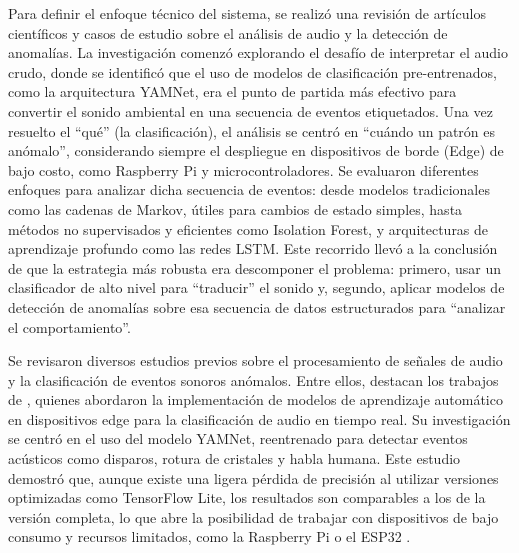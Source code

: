 

Para definir el enfoque técnico del sistema, se realizó una revisión de artículos científicos y casos de estudio sobre el análisis de audio y la detección de anomalías. La investigación comenzó explorando el desafío de interpretar el audio crudo, donde se identificó que el uso de modelos de clasificación pre-entrenados, como la arquitectura YAMNet, era el punto de partida más efectivo para convertir el sonido ambiental en una secuencia de eventos etiquetados. Una vez resuelto el ``qué'' (la clasificación), el análisis se centró en ``cuándo un patrón es anómalo'', considerando siempre el despliegue en dispositivos de borde (Edge) de bajo costo, como Raspberry Pi y microcontroladores. Se evaluaron diferentes enfoques para analizar dicha secuencia de eventos: desde modelos tradicionales como las cadenas de Markov, útiles para cambios de estado simples, hasta métodos no supervisados y eficientes como Isolation Forest, y arquitecturas de aprendizaje profundo como las redes LSTM. Este recorrido llevó a la conclusión de que la estrategia más robusta era descomponer el problema: primero, usar un clasificador de alto nivel para ``traducir'' el sonido y, segundo, aplicar modelos de detección de anomalías sobre esa secuencia de datos estructurados para ``analizar el comportamiento''.


Se revisaron diversos estudios previos sobre el procesamiento de señales de audio y la clasificación de eventos sonoros anómalos. Entre ellos, destacan los trabajos de \citeauthor{malmberg_real-time_2021} \citeyear{malmberg_real-time_2021}, quienes abordaron la implementación de modelos de aprendizaje automático en dispositivos edge para la clasificación de audio en tiempo real. Su investigación se centró en el uso del modelo YAMNet, reentrenado para detectar eventos acústicos como disparos, rotura de cristales y habla humana. Este estudio demostró que, aunque existe una ligera pérdida de precisión al utilizar versiones optimizadas como TensorFlow Lite, los resultados son comparables a los de la versión completa, lo que abre la posibilidad de trabajar con dispositivos de bajo consumo y recursos limitados, como la Raspberry Pi o el ESP32 \cite{malmberg_real-time_2021}.

